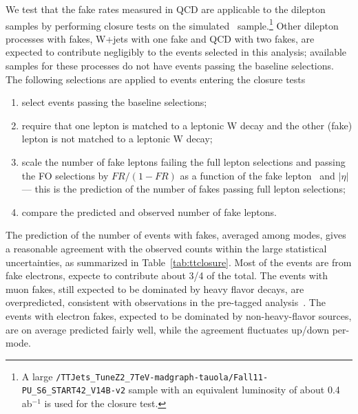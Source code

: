 We test that the fake rates measured in QCD are applicable to the dilepton samples by performing closure
tests on the simulated \ttbar\ sample.\footnote{A large {\tt /TTJets\_TuneZ2\_7TeV-madgraph-tauola/Fall11-PU\_S6\_START42\_V14B-v2} 
sample with an equivalent luminosity of about 0.4 ab$^{-1}$ is used for the closure test.}
Other dilepton processes with fakes, W+jets with one fake and QCD with two fakes, are expected
to contribute negligibly to the events selected in this analysis;
available samples for these processes do not have events passing the baseline selections.
The following selections are applied to events entering the closure tests
\begin{enumerate}
\item select events passing the baseline selections;
\item require that one lepton is matched to a leptonic W decay and the other (fake) lepton is not
matched to a leptonic W decay;
\item scale the number of fake leptons failing the full lepton selections and passing the FO selections
	by $FR/(1-FR)$ as a function of the fake lepton \pt\ and $|\eta|$ --- this is the prediction
	of the number of fakes passing full lepton selections;
\item compare the predicted and observed number of fake leptons.
\end{enumerate}
The prediction of the number of events with fakes,
averaged among modes, gives a reasonable agreement with the observed counts
within the large statistical uncertainties, as summarized in Table~\ref{tab:ttclosure}.
Most of the events are from fake electrons, expecte to contribute about 3/4 of the total.
The events with muon fakes, still expected to be dominated by heavy flavor decays,
are overpredicted, consistent with observations in the pre-tagged analysis~\cite{ssnote2011}.
The events with electron fakes, expected to be dominated by non-heavy-flavor sources,
are on average predicted fairly well, while the agreement fluctuates up/down per-mode.

